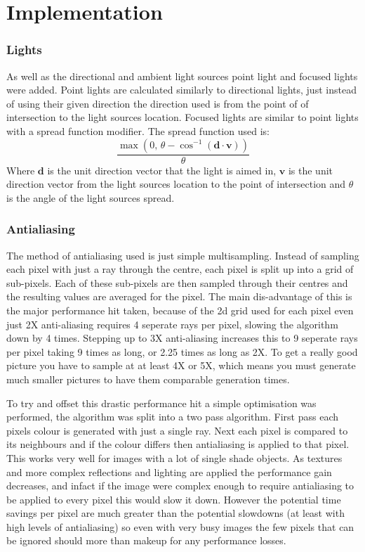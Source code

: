 \chapter{Implementation}
  \subsection{Lights}
    As well as the directional and ambient light sources point light and focused
    lights were added.  Point lights are calculated similarly to directional
    lights, just instead of using their given direction the direction used is
    from the point of of intersection to the light sources location.  Focused
    lights are similar to point lights with a spread function modifier.  The
    spread function used is:
    \[ \frac{\max\left(0,\, \theta - \cos^{-1}\left( \mathbf{d} \cdot
    \mathbf{v}\right)\right)}{\theta} \]
    Where $\mathbf{d}$ is the unit direction vector that the light is aimed in,
    $\mathbf{v}$ is the unit direction vector from the light sources location to
    the point of intersection and $\theta$ is the angle of the light sources
    spread.

  \subsection{Antialiasing}
    The method of antialiasing used is just simple multisampling.  Instead of
    sampling each pixel with just a ray through the centre, each pixel is split
    up into a grid of sub-pixels.  Each of these sub-pixels are then sampled
    through their centres and the resulting values are averaged for the pixel.
    The main dis-advantage of this is the major performance hit taken, because
    of the 2d grid used for each pixel even just 2X anti-aliasing requires 4
    seperate rays per pixel, slowing the algorithm down by 4 times.  Stepping up
    to 3X anti-aliasing increases this to 9 seperate rays per pixel taking 9
    times as long, or 2.25 times as long as 2X.  To get a really good picture
    you have to sample at at least 4X or 5X, which means you must generate much
    smaller pictures to have them comparable generation times.

    To try and offset this drastic performance hit a simple optimisation was
    performed, the algorithm was split into a two pass algorithm.  First pass
    each pixels colour is generated with just a single ray.  Next each pixel is
    compared to its neighbours and if the colour differs then antialiasing is
    applied to that pixel.  This works very well for images with a lot of single
    shade objects.  As textures and more complex reflections and lighting are
    applied the performance gain decreases, and infact if the image were complex
    enough to require antialiasing to be applied to every pixel this would slow
    it down.  However the potential time savings per pixel are much greater than
    the potential slowdowns (at least with high levels of antialiasing) so even
    with very busy images the few pixels that can be ignored should more than
    makeup for any performance losses.

